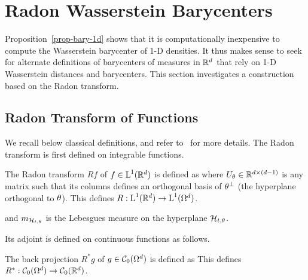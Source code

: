 \section{Radon Wasserstein Barycenters}
\label{sec-bary-radon}

Proposition~\ref{prop-bary-1d} shows that it is computationally inexpensive to compute the Wasserstein barycenter of 1-D densities. It thus makes sense to seek for alternate definitions of barycenters of measures in $\mathbb{R}^d$ that rely on 1-D Wasserstein distances and barycenters. This section investigates a construction based on the Radon transform.

\subsection{Radon Transform of Functions}

We recall below classical definitions, and refer to~\cite{Helgason-radonbook} for more details. The Radon transform is first defined on integrable functions. 

\begin{defn}
The Radon transform $Rf$ of $f \in \text{\upshape L}^1(\mathbb{R}^d)$ is defined as
where $U_\theta \in {\mathbb R}^{d\times(d-1)}$ is any matrix such that its  columns defines an orthogonal basis of $\theta^\perp$ (the hyperplane orthogonal to $\theta$). 
This defines $R : \text{\upshape L}^1(\mathbb{R}^d) \rightarrow \text{\upshape L}^1(\Omega^d)$. 
\end{defn}


and $m_{\mathcal{H}_{t,\theta}}$ is the Lebesgues measure on the hyperplane $\mathcal{H}_{t,\theta}$.
\fi


Its adjoint is defined on continuous functions as follows.

\begin{defn} 
The back projection $R^*g$ of $g \in \mathcal{C}_0(\Omega^d)$ is defined as
This defines $R^* : \mathcal{C}_0(\Omega^d) \rightarrow \mathcal{C}_0(\mathbb{R}^d)$. 
\end{defn}

